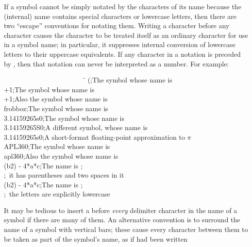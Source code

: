 If a symbol cannot be simply notated by the characters of its name
because the (internal) name contains special characters or lowercase letters,
then there are two ``escape'' conventions for notating them.
Writing a \cd{{\Xbackslash}} character before any character causes the character
to be treated itself as an ordinary character for use in a symbol name;
in particular, it suppresses internal conversion of lowercase letters
to their uppercase equivalents.
If any character in a notation is preceded by \cd{{\Xbackslash}}, then that
notation can never be interpreted as a number.
For example:
\begin{lisp}
~~~~~~~~~~~~~~~~~~~~~~~~\=\kill
{\Xbackslash}(\>;{\rm The symbol whose name is \cd{(}} \\
{\Xbackslash}+1\>;{\rm The symbol whose name is } \\
+{\Xbackslash}1\>;{\rm Also the symbol whose name is } \\
{\Xbackslash}frobboz\>;{\rm The symbol whose name is } \\
3.14159265{\Xbackslash}s0\>;{\rm The symbol whose name is } \\
3.14159265{\Xbackslash}S0\>;{\rm A different symbol, whose name is } \\
3.14159265s0\>;{\rm A short-format floating-point approximation to \(\pi\)} \\
APL{\Xbackslash}{\Xbackslash}360\>;{\rm The symbol whose name is } \\
apl{\Xbackslash}{\Xbackslash}360\>;{\rm Also the symbol whose name is } \\
{\Xbackslash}(b{\Xcircumflex}2{\Xbackslash}){\Xbackslash} -{\Xbackslash} 4*a*c\>;{\rm The name is ;} \\
\>;~{\rm it has parentheses and two spaces in it} \\
{\Xbackslash}({\Xbackslash}b{\Xcircumflex}2{\Xbackslash}){\Xbackslash} -{\Xbackslash} 4*{\Xbackslash}a*{\Xbackslash}c\>;{\rm The name is ;} \\
\>;~{\rm the letters are explicitly lowercase}
\end{lisp}
It may be tedious to insert a \cd{{\Xbackslash}} before {\it every} delimiter
character in the name of a symbol if there are many of them.
An alternative convention is to surround the name of a symbol
with vertical bars; these cause every character between them to
be taken as part of the symbol's name, as if \cd{{\Xbackslash}} had been written
